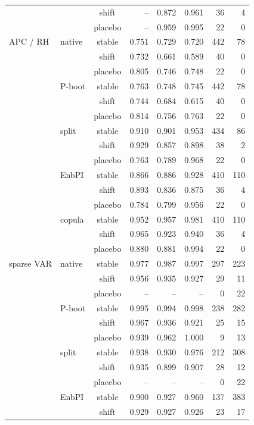 {\begin{longtable}{@{}llcrrrrr@{}}
 &  & shift & -- & 0.872 & 0.961 & 36 & 4 \\
 &  & placebo & -- & 0.959 & 0.995 & 22 & 0 \\
\addlinespace[2pt]
APC / RH & native & stable & 0.751 & 0.729 & 0.720 & 442 & 78 \\
 &  & shift & 0.732 & 0.661 & 0.589 & 40 & 0 \\
 &  & placebo & 0.805 & 0.746 & 0.748 & 22 & 0 \\
 & P-boot & stable & 0.763 & 0.748 & 0.745 & 442 & 78 \\
 &  & shift & 0.744 & 0.684 & 0.615 & 40 & 0 \\
 &  & placebo & 0.814 & 0.756 & 0.763 & 22 & 0 \\
 & split & stable & 0.910 & 0.901 & 0.953 & 434 & 86 \\
 &  & shift & 0.929 & 0.857 & 0.898 & 38 & 2 \\
 &  & placebo & 0.763 & 0.789 & 0.968 & 22 & 0 \\
 & EnbPI & stable & 0.866 & 0.886 & 0.928 & 410 & 110 \\
 &  & shift & 0.893 & 0.836 & 0.875 & 36 & 4 \\
 &  & placebo & 0.784 & 0.799 & 0.956 & 22 & 0 \\
 & copula & stable & 0.952 & 0.957 & 0.981 & 410 & 110 \\
 &  & shift & 0.965 & 0.923 & 0.940 & 36 & 4 \\
 &  & placebo & 0.880 & 0.881 & 0.994 & 22 & 0 \\
\addlinespace[2pt]
sparse VAR & native & stable & 0.977 & 0.987 & 0.997 & 297 & 223 \\
 &  & shift & 0.956 & 0.935 & 0.927 & 29 & 11 \\
 &  & placebo & -- & -- & -- & 0 & 22 \\
 & P-boot & stable & 0.995 & 0.994 & 0.998 & 238 & 282 \\
 &  & shift & 0.967 & 0.936 & 0.921 & 25 & 15 \\
 &  & placebo & 0.939 & 0.962 & 1.000 & 9 & 13 \\
 & split & stable & 0.938 & 0.930 & 0.976 & 212 & 308 \\
 &  & shift & 0.935 & 0.899 & 0.907 & 28 & 12 \\
 &  & placebo & -- & -- & -- & 0 & 22 \\
 & EnbPI & stable & 0.900 & 0.927 & 0.960 & 137 & 383 \\
 &  & shift & 0.929 & 0.927 & 0.926 & 23 & 17 \\

\end{longtable}}
